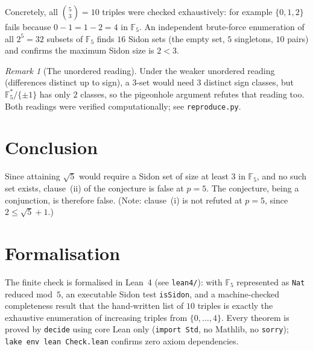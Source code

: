 \documentclass[11pt]{article}
\theoremstyle{plain}
\theoremstyle{remark}
\newtheorem{remark}{Remark}
\begin{document}
Concretely, all $\binom{5}{3} = 10$ triples were checked exhaustively:
for example $\{0,1,2\}$ fails because $0-1 = 1-2 = 4$ in $\mathbb{F}_5$.
An independent brute-force enumeration of all $2^5 = 32$ subsets of
$\mathbb{F}_5$ finds $16$ Sidon sets (the empty set, $5$ singletons, $10$
pairs) and confirms the maximum Sidon size is $2 < 3$.

\begin{remark}[The unordered reading]
Under the weaker unordered reading (differences distinct up to sign), a
$3$-set would need $3$ distinct sign classes, but
$\mathbb{F}_5^*/\{\pm 1\}$ has only $2$ classes, so the pigeonhole argument
refutes that reading too.  Both readings were verified computationally;
see \texttt{reproduce.py}.
\end{remark}

\section{Conclusion}

Since attaining $\sqrt{5}$ would require a Sidon set of size at least $3$
in $\mathbb{F}_5$, and no such set exists, clause~(ii) of the conjecture is
false at $p = 5$.  The conjecture, being a conjunction, is therefore false.
(Note: clause~(i) is not refuted at $p = 5$, since $2 \le \sqrt{5}+1$.)

\section{Formalisation}

The finite check is formalised in Lean~4 (see \texttt{lean4/}): with
$\mathbb{F}_5$ represented as \texttt{Nat} reduced mod~$5$, an executable
Sidon test \texttt{isSidon}, and a machine-checked completeness result that
the hand-written list of $10$ triples is exactly the exhaustive enumeration
of increasing triples from $\{0,\dots,4\}$.  Every theorem is proved by
\texttt{decide} using core Lean only (\texttt{import Std}, no Mathlib, no
\texttt{sorry}); \texttt{lake env lean Check.lean} confirms zero axiom
dependencies.
\end{document}
